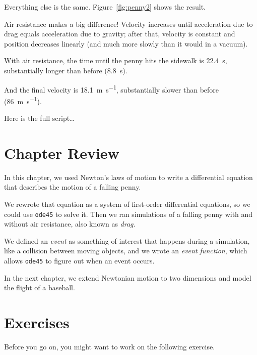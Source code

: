 Everything else is the same.  Figure~\ref{fig:penny2} shows the result.

Air resistance makes a big difference! Velocity increases until
acceleration due to drag equals acceleration due to gravity; after that, velocity is constant and position decreases linearly (and much more slowly than it would in a vacuum).

With air resistance, the time until the penny hits the sidewalk is \SI{22.4}{\second}, substantially longer than before (\SI{8.8}{\second}).

And the final velocity is \SI{18.1}{\meter \per \second}, substantially slower than before (\SI{86}{\meter \per \second}).

Here is the full script\dots


\section{Chapter Review}

In this chapter, we used Newton's laws of motion to write a differential equation that describes the motion of a falling penny.

We rewrote that equation as a system of first-order differential equations, so we could use \lstinline{ode45} to solve it.  Then we ran simulations of a falling penny with and without air resistance, also known as \emph{drag}.

We defined an \emph{event} as something of interest that happens during a simulation, like a collision between moving objects, and we wrote an \emph{event function}, which allows \lstinline{ode45} to figure out when an event occurs.

In the next chapter, we extend Newtonian motion to two dimensions and model the flight of a baseball.


\section{Exercises}

Before you go on, you might want to work on the following exercise.

